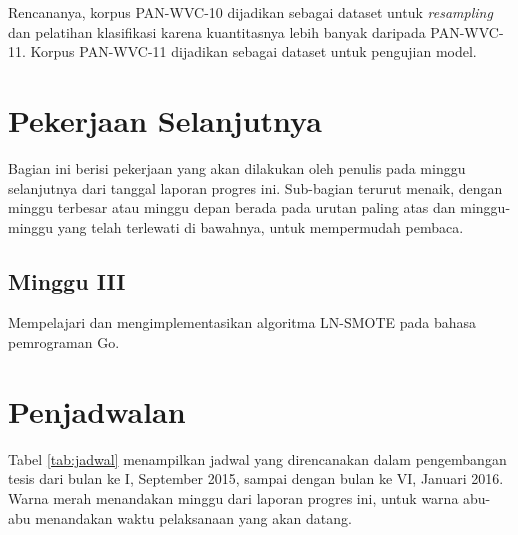 \documentclass[12pt,a4paper,titlepage]{article}
\begin{document}
Rencananya, korpus PAN-WVC-10 dijadikan sebagai dataset untuk \textit{resampling} dan pelatihan klasifikasi karena kuantitasnya lebih banyak daripada PAN-WVC-11.
Korpus PAN-WVC-11 dijadikan sebagai dataset untuk pengujian model.

\section{Pekerjaan Selanjutnya}

Bagian ini berisi pekerjaan yang akan dilakukan oleh penulis pada minggu selanjutnya dari tanggal laporan progres ini.
Sub-bagian terurut menaik, dengan minggu terbesar atau minggu depan berada pada urutan paling atas dan minggu-minggu yang telah terlewati di bawahnya, untuk mempermudah pembaca.

\subsection{Minggu III}

Mempelajari dan mengimplementasikan algoritma LN-SMOTE pada bahasa pemrograman Go.


\newpage
\section{Penjadwalan}\label{sec:penjadwalan}

Tabel \ref{tab:jadwal} menampilkan jadwal yang direncanakan dalam pengembangan tesis dari bulan ke I, September 2015, sampai dengan bulan ke VI, Januari 2016.
Warna merah menandakan minggu dari laporan progres ini, untuk warna abu-abu menandakan waktu pelaksanaan yang akan datang.

\newcommand{\tand}{&}
\newcommand{\fillcell}[1]{%
	\forloop{cnt}{0}{\value{cnt}<#1}{%
		{\cellcolor[gray]{0.7}} \tand
	}%
}
\newcommand{\emptycell}[2]{%
	\forloop{cnt}{0}{\value{cnt}<#1}{%
		\tand
	}%
	\ifthenelse{#2 = 1}{\\}{\tand}%
}
\newcommand{\progresscell}[1]{%
	\forloop{cnt}{0}{\value{cnt}<#1}{%
		{\cellcolor{red!80}} \tand
	}%
}
\end{document}
